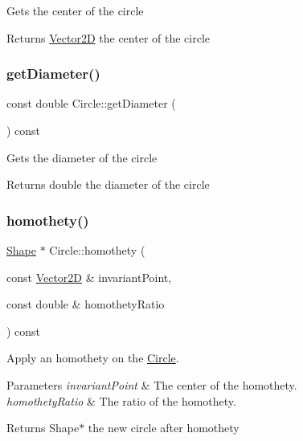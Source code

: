 Gets the center of the circle \begin{DoxyReturn}{Returns}
\hyperlink{class_vector2_d}{Vector2D} the center of the circle 
\end{DoxyReturn}
\hypertarget{class_circle_af54e2c9adcf8e6f53ec51560fff849d7}{}\label{class_circle_af54e2c9adcf8e6f53ec51560fff849d7} 
\subsubsection{\texorpdfstring{get\+Diameter()}{getDiameter()}}
{\footnotesize\ttfamily const double Circle\+::get\+Diameter (\begin{DoxyParamCaption}{ }\end{DoxyParamCaption}) const}

Gets the diameter of the circle \begin{DoxyReturn}{Returns}
double the diameter of the circle 
\end{DoxyReturn}
\hypertarget{class_circle_a031f188681977c2cf6ba2e80e30fb5ce}{}\label{class_circle_a031f188681977c2cf6ba2e80e30fb5ce} 
\subsubsection{\texorpdfstring{homothety()}{homothety()}}
{\footnotesize\ttfamily \hyperlink{class_shape}{Shape} $\ast$ Circle\+::homothety (\begin{DoxyParamCaption}\item[{const \hyperlink{class_vector2_d}{Vector2D} \&}]{invariant\+Point,  }\item[{const double \&}]{homothety\+Ratio }\end{DoxyParamCaption}) const\hspace{0.3cm}{\ttfamily [virtual]}}

Apply an homothety on the \hyperlink{class_circle}{Circle}. 
\begin{DoxyParams}{Parameters}
{\em invariant\+Point} & The center of the homothety. \\
\hline
{\em homothety\+Ratio} & The ratio of the homothety. \\
\hline
\end{DoxyParams}
\begin{DoxyReturn}{Returns}
Shape$\ast$ the new circle after homothety 
\end{DoxyReturn}


